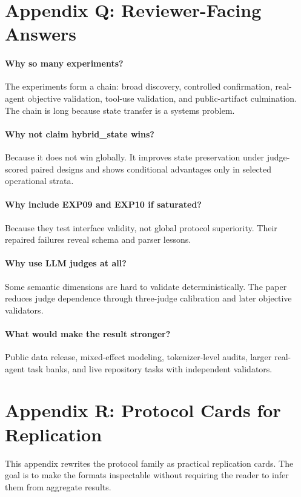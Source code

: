 \documentclass[11pt]{article}
\begin{document}
\section{Appendix Q: Reviewer-Facing Answers}
\paragraph{Why so many experiments?} The experiments form a chain: broad discovery, controlled confirmation, real-agent objective validation, tool-use validation, and public-artifact culmination. The chain is long because state transfer is a systems problem.

\paragraph{Why not claim hybrid\_state wins?} Because it does not win globally. It improves state preservation under judge-scored paired designs and shows conditional advantages only in selected operational strata.

\paragraph{Why include EXP09 and EXP10 if saturated?} Because they test interface validity, not global protocol superiority. Their repaired failures reveal schema and parser lessons.

\paragraph{Why use LLM judges at all?} Some semantic dimensions are hard to validate deterministically. The paper reduces judge dependence through three-judge calibration and later objective validators.

\paragraph{What would make the result stronger?} Public data release, mixed-effect modeling, tokenizer-level audits, larger real-agent task banks, and live repository tasks with independent validators.

\clearpage
\section{Appendix R: Protocol Cards for Replication}
This appendix rewrites the protocol family as practical replication cards. The goal is to make the formats inspectable without requiring the reader to infer them from aggregate results.
\end{document}
